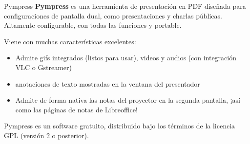 \begin{frame}[c]{Pympress}
  \textbf{Pympress} es una herramienta de presentación en PDF diseñada
  para configuraciones de pantalla dual, como presentaciones y charlas
  públicas. Altamente configurable, con todas las funciones y portable.

  \vspace{\baselineskip}
  Viene con muchas características excelentes:

  \begin{itemize}
    \item Admite gifs integrados (listos para usar), videos y audios
      (con integración VLC o Gstreamer)
    \item anotaciones de texto mostradas en la ventana del presentador
    \item Admite de forma nativa las notas del proyector en la segunda
      pantalla, ¡así como las páginas de notas de Libreoffice!
  \end{itemize}

  \vspace{\baselineskip}
  Pympress es un software gratuito, distribuido bajo los términos de la
  licencia GPL (versión 2 o posterior).
\end{frame}
